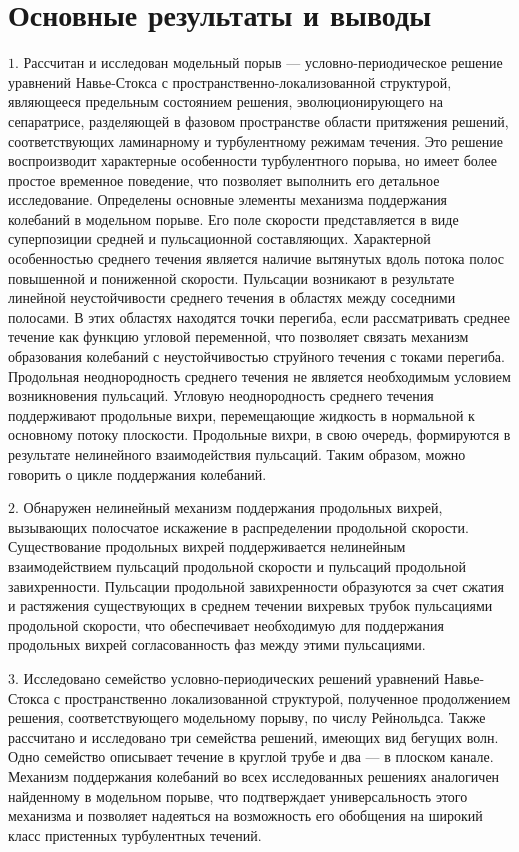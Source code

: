 
\section*{\centering Основные результаты и выводы}

$1.$ Рассчитан и исследован модельный порыв --- условно-периодическое решение уравнений Навье-Стокса с пространственно-локализованной структурой, являющееся предельным состоянием решения, эволюционирующего на сепаратрисе, разделяющей в фазовом пространстве области притяжения решений, соответствующих ламинарному и турбулентному режимам течения. Это решение воспроизводит характерные особенности турбулентного порыва, но имеет более простое временное поведение, что позволяет выполнить его детальное исследование. Определены основные элементы механизма поддержания колебаний в модельном порыве. Его поле скорости представляется в виде суперпозиции средней и пульсационной составляющих. Характерной особенностью среднего течения является наличие вытянутых вдоль потока полос повышенной и пониженной скорости. Пульсации возникают в результате линейной неустойчивости среднего течения в областях между соседними полосами. В этих областях находятся точки перегиба, если рассматривать среднее течение как функцию угловой переменной, что позволяет связать механизм образования колебаний с неустойчивостью струйного течения с токами перегиба. Продольная неоднородность среднего течения не является необходимым условием возникновения пульсаций. Угловую неоднородность среднего течения поддерживают продольные вихри, перемещающие жидкость в нормальной к основному потоку плоскости. Продольные вихри, в свою очередь, формируются в результате нелинейного взаимодействия пульсаций. Таким образом, можно говорить о цикле поддержания колебаний. 

$2.$ Обнаружен нелинейный механизм поддержания продольных вихрей, вызывающих полосчатое искажение в распределении продольной скорости. Существование продольных вихрей поддерживается нелинейным взаимодействием пульсаций продольной скорости и пульсаций продольной завихренности. Пульсации продольной завихренности образуются за счет сжатия и растяжения существующих в среднем течении вихревых трубок пульсациями продольной скорости, что обеспечивает необходимую для поддержания продольных вихрей согласованность фаз между этими пульсациями. 

$3.$ Исследовано семейство условно-периодических решений уравнений Навье-Стокса с пространственно локализованной структурой, полученное продолжением решения, соответствующего модельному порыву, по числу Рейнольдса. Также рассчитано и исследовано три семейства решений, имеющих вид бегущих волн. Одно семейство описывает течение в круглой трубе и два --- в плоском канале. Механизм поддержания колебаний во всех исследованных решениях аналогичен найденному в модельном порыве, что подтверждает универсальность этого механизма и позволяет надеяться на возможность его обобщения на широкий класс пристенных турбулентных течений.
